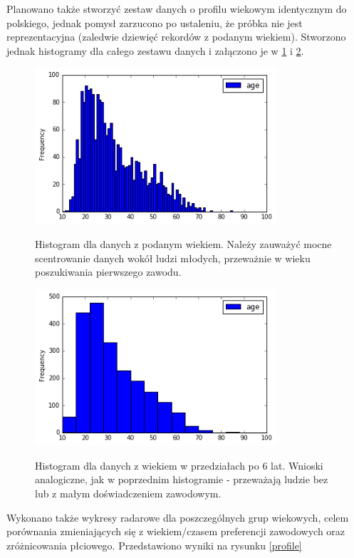 \documentclass[12pt,a4paper,oneside]{report} %
\begin{document}
Planowano także stworzyć zestaw danych o profilu wiekowym identycznym do polskiego, jednak pomysł zarzucono po ustaleniu, że próbka nie jest reprezentacyjna (zaledwie dziewięć rekordów z podanym wiekiem). Stworzono jednak histogramy dla całego zestawu danych i załączono je w \ref{histo1} i \ref{histo2}. \par

\begin{figure}
\centering
\includegraphics[width=0.8\textwidth]{histo1.png}
\label{histo1}
\caption{Histogram dla danych z podanym wiekiem. Należy zauważyć mocne scentrowanie danych wokół ludzi młodych, przeważnie w wieku poszukiwania pierwszego zawodu.}
\end{figure}

\begin{figure}
\centering
\includegraphics[width=0.8\textwidth]{histo2.png}
\label{histo2}
\caption{Histogram dla danych z wiekiem w przedziałach po 6 lat. Wnioski analogiczne, jak w poprzednim histogramie - przeważają ludzie bez lub z małym doświadczeniem zawodowym.}
\end{figure}


Wykonano także wykresy radarowe dla poszczególnych grup wiekowych, celem porównania zmieniających się z wiekiem/czasem 
preferencji zawodowych oraz zróżnicowania płciowego. Przedstawiono wyniki na rysunku \ref{profile} \par
\end{document}
